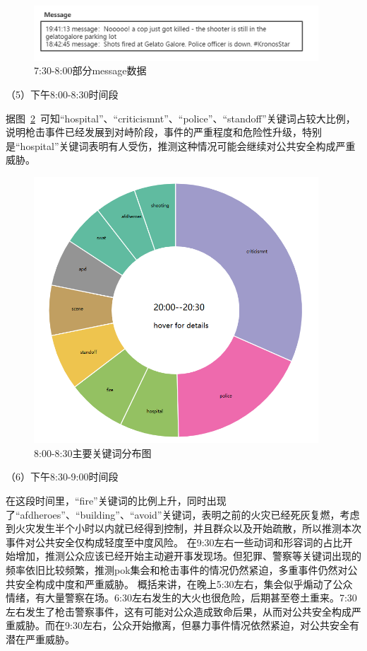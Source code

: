 \documentclass[a4paper]{article}
\begin{document}
\begin{figure}[H]
  \centering
  \includegraphics[width=0.95\textwidth]{images/2-9.png}
  \caption{7:30-8:00部分message数据}\label{fig:2-9}
  \vspace{\baselineskip}
\end{figure}
（5）下午8:00-8:30时间段

据图~\ref{fig:2-10}~可知“hospital”、“criticismnt”、“police”、“standoff”关键词占较大比例，说明枪击事件已经发展到对峙阶段，事件的严重程度和危险性升级，特别是“hospital”关键词表明有人受伤，推测这种情况可能会继续对公共安全构成严重威胁。

\begin{figure}[H]
  \centering
  \includegraphics[width=0.95\textwidth]{images/2-10.png}
  \caption{8:00-8:30主要关键词分布图}\label{fig:2-10}
  \vspace{\baselineskip}
\end{figure}
（6）下午8:30-9:00时间段

在这段时间里，“fire”关键词的比例上升，同时出现了“afdheroes”、“building”、“avoid”关键词，表明之前的火灾已经死灰复燃，考虑到火灾发生半个小时以内就已经得到控制，并且群众以及开始疏散，所以推测本次事件对公共安全仅构成轻度至中度风险。
在9:30左右一些动词和形容词的占比开始增加，推测公众应该已经开始主动避开事发现场。但犯罪、警察等关键词出现的频率依旧比较频繁，推测pok集会和枪击事件的情况仍然紧迫，多重事件仍然对公共安全构成中度和严重威胁。
概括来讲，在晚上5:30左右，集会似乎煽动了公众情绪，有大量警察在场。6:30左右发生的大火也很危险，后期甚至卷土重来。7:30左右发生了枪击警察事件，这有可能对公众造成致命后果，从而对公共安全构成严重威胁。而在9:30左右，公众开始撤离，但暴力事件情况依然紧迫，对公共安全有潜在严重威胁。
\end{document}
